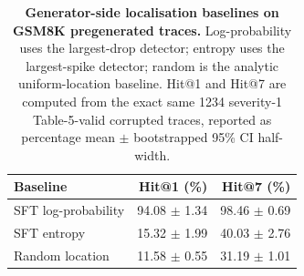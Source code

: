 \begin{table}[t]
\centering
\small
\renewcommand{\arraystretch}{1.08}
\begin{tabular}{l r r}
\toprule
\textbf{Baseline} & \textbf{Hit@1 (\%)} & \textbf{Hit@7 (\%)} \\
\midrule
SFT log-probability & 94.08 $\pm$ 1.34 & 98.46 $\pm$ 0.69 \\
SFT entropy & 15.32 $\pm$ 1.99 & 40.03 $\pm$ 2.76 \\
Random location & 11.58 $\pm$ 0.55 & 31.19 $\pm$ 1.01 \\
\bottomrule
\end{tabular}
\caption{\textbf{Generator-side localisation baselines on GSM8K pregenerated traces.} Log-probability uses the largest-drop detector; entropy uses the largest-spike detector; random is the analytic uniform-location baseline. Hit@1 and Hit@7 are computed from the exact same 1234 severity-1 Table-5-valid corrupted traces, reported as percentage mean $\pm$ bootstrapped 95\% CI half-width.}
\label{tab:localisation_policy_token_baselines_hit1_hit7}
\end{table}
